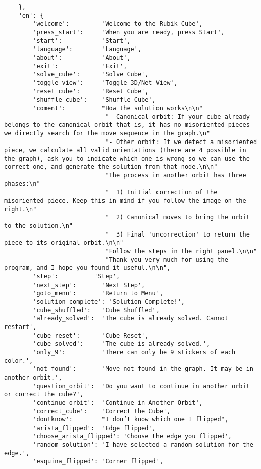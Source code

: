 \begin{lstlisting}
    },
    'en': {
        'welcome':         'Welcome to the Rubik Cube',
        'press_start':     'When you are ready, press Start',
        'start':           'Start',
        'language':        'Language',
        'about':           'About',
        'exit':            'Exit',
        'solve_cube':      'Solve Cube',
        'toggle_view':     'Toggle 3D/Net View',
        'reset_cube':      'Reset Cube',
        'shuffle_cube':    'Shuffle Cube',
        'coment':          "How the solution works\n\n"
                            "- Canonical orbit: If your cube already belongs to the canonical orbit—that is, it has no misoriented pieces—we directly search for the move sequence in the graph.\n"
                            "- Other orbit: If we detect a misoriented piece, we calculate all valid orientations (there are 4 possible in the graph), ask you to indicate which one is wrong so we can use the correct one, and generate the solution from that node.\n\n"
                            "The process in another orbit has three phases:\n"
                            "  1) Initial correction of the misoriented piece. Keep this in mind if you follow the image on the right.\n"
                            "  2) Canonical moves to bring the orbit to the solution.\n"
                            "  3) Final 'uncorrection' to return the piece to its original orbit.\n\n"
                            "Follow the steps in the right panel.\n\n"
                            "Thank you very much for using the program, and I hope you found it useful.\n\n",
        'step':          'Step',
        'next_step':       'Next Step',
        'goto_menu':       'Return to Menu',
        'solution_complete': 'Solution Complete!',
        'cube_shuffled':   'Cube Shuffled',
        'already_solved':  'The cube is already solved. Cannot restart',
        'cube_reset':      'Cube Reset',
        'cube_solved':     'The cube is already solved.',
        'only_9':          'There can only be 9 stickers of each color.',
        'not_found':       'Move not found in the graph. It may be in another orbit.',
        'question_orbit':  'Do you want to continue in another orbit or correct the cube?',
        'continue_orbit':  'Continue in Another Orbit',
        'correct_cube':    'Correct the Cube',
        'dontknow':        "I don’t know which one I flipped",  
        'arista_flipped':  'Edge flipped',
        'choose_arista_flipped': 'Choose the edge you flipped',
        'random_solution': 'I have selected a random solution for the edge.',
        'esquina_flipped': 'Corner flipped',

\end{lstlisting}
